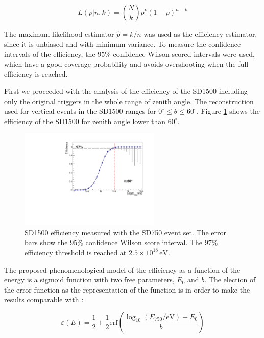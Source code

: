 \documentclass[12pt,a4paper]{article}
\newcommand{\eV}{\, \mathrm{eV}}
\begin{document}
\begin{equation}
L(p|n,k)=\binom{N}{k}p^k(1-p)^{n-k}
\label{eqn:Binomial}
\end{equation}

The maximum likelihood estimator $\hat{p}=k/n$ was used as the efficiency estimator, since it is unbiased and with minimum variance. To measure the confidence intervals of the efficiency, the $95\%$ confidence Wilson scored intervals were used, which have a good coverage probability and avoids overshooting when the full efficiency is reached.

First we proceeded with the analysis of the efficiency of the SD1500 including only the original triggers in the whole range of zenith angle. The reconstruction used for vertical events in the SD1500 ranges for $0^{\circ}\leq\theta\leq60^{\circ}$.  Figure \ref{fig:allZenith} shows the efficiency of the SD1500 for zenith angle lower than $60^{\circ}$. 

\begin{figure}[h!]
    \begin{center}
        \includegraphics[width=0.6\textwidth]{plots/allZenith.pdf}  
        \caption{SD1500 efficiency measured with the SD750 event set. The error bars show the $95\%$ confidence Wilson score interval. The $97\%$ efficiency threshold is reached at $2.5\times10^{18}\eV$.
        \label{fig:allZenith}}
        \vspace{-0.5 cm}
    \end{center}
\end{figure}

The proposed phenomenological model of the efficiency as a function of the energy is a sigmoid function with two free parameters, $E_0$ and $b$. The election of the error function as the representation of the function is in order to make the results comparable with \cite{VerticalSpectrum}:

\begin{equation}
\varepsilon(E)=\frac{1}{2} + \frac{1}{2}\mathrm{erf}\left(\frac{\log_{10}(E_{750}/\mathrm{eV})-E_{0}}{b}\right)
\label{eqn:Efficiency}
\end{equation}
\end{document}
